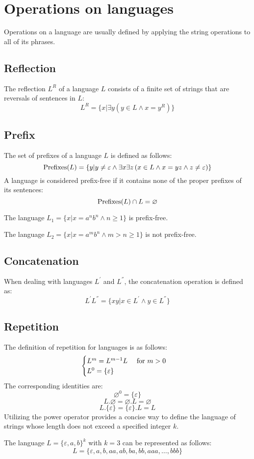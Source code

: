 \section{Operations on languages}

Operations on a language are usually defined by applying the string operations to all of its phrases.

\subsection*{Reflection}
The reflection $L^R$ of a language $L$ consists of a finite set of strings that are reversals of sentences in $L$: 
\[L^R = \{ x | \exists y \left( y \in L \land x=y^R \right)\}\]

\subsection*{Prefix}  
The set of prefixes of a language $L$ is defined as follows:
\[\textnormal{Prefixes}(L)=\{y | y \neq \varepsilon \land \exists x \exists z \left( x \in L \land x=yz \land z \neq \varepsilon \right)\}\]
A language is considered prefix-free if it contains none of the proper prefixes of its sentences:
\[\textnormal{Prefixes}(L) \cap L = \varnothing\]
\begin{example}
    The language $L_1=\{x|x=a^nb^n \land n \geq 1\}$ is prefix-free. 
    
    The language $L_2=\{x|x=a^mb^n \land m > n \geq 1\}$ is not prefix-free. 
\end{example}

\subsection*{Concatenation}  
When dealing with languages $L^{'}$ and $L^{''}$, the concatenation operation is defined as:
\[L^{'}L^{''}=\{ xy | x \in L^{'} \land y \in L^{''} \}\]

\subsection*{Repetition}  
The definition of repetition for languages is as follows:
\[  
\begin{cases}
    L^m=L^{m-1}L \:\:\:\:\:\: \textnormal{for } m > 0 \\
    L^0=\{ \varepsilon \}
\end{cases} 
\]
The corresponding identities are:
\[\varnothing ^0 = \{ \varepsilon \} \]
\[L.\varnothing=\varnothing .L=\varnothing \]
\[L.\{\varepsilon\}=\{\varepsilon\} .L=L\]
Utilizing the power operator provides a concise way to define the language of strings whose length does not exceed a specified integer $k$. 
\begin{example}
    The language $L=\{\varepsilon,a,b\}^k$ with $k=3$ can be represented as follows: 
    \[L=\{\varepsilon,a,b,aa,ab,ba,bb,aaa,\dots,bbb\}\] 
\end{example}

